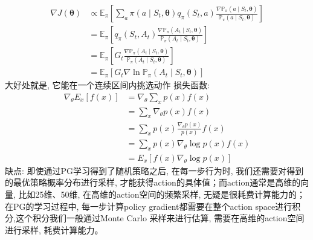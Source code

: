 \documentclass{article}
\begin{document}
        \begin{align*}
            \nabla J(\boldsymbol{\theta}) 
            & \propto \mathbb{E}_{\pi}\left[\sum_{a} \pi\left(a \mid S_{t}, \boldsymbol{\theta}\right) q_{\pi}\left(S_{t}, a\right) \frac{\nabla \mathbb{P}_\pi\left(a \mid S_{t}, \boldsymbol{\theta}\right)}{\mathbb{P}_\pi\left(a \mid S_{t}, \boldsymbol{\theta}\right)}\right] \\
            &= \mathbb{E}_{\pi}\left[q_{\pi}\left(S_{t}, A_{t}\right) \frac{\nabla \mathbb{P}_\pi\left(A_{t} \mid S_{t}, \boldsymbol{\theta}\right)}{\mathbb{P}_\pi\left(A_{t} \mid S_{t}, \boldsymbol{\theta}\right)}\right] \\
            &= \mathbb{E}_{\pi}\left[G_{t} \frac{\nabla \mathbb{P}_\pi\left(A_{t} \mid S_{t}, \boldsymbol{\theta}\right)}{\mathbb{P}_\pi\left(A_{t} \mid S_{t}, \boldsymbol{\theta}\right)}\right]\\
            &= \mathbb{E}_{\pi}\left[G_{t} \nabla \ln \mathbb{P}_\pi \left(A_{t} \mid S_{t}, \boldsymbol{\theta}\right)\right]
        \end{align*}
        大好处就是, 它能在一个连续区间内挑选动作
        损失函数:
            \begin{align*}
                \nabla_{\theta} E_{x}[f(x)] &=\nabla_{\theta} \sum_{x} p(x) f(x) \\
                &=\sum_{x} \nabla_{\theta} p(x) f(x) \\
                &=\sum_{x} p(x) \frac{\nabla_{\theta} p(x)}{p(x)} f(x) \\
                &=\sum_{x} p(x) \nabla_{\theta} \log p(x) f(x) \\
                &=E_{x}\left[f(x) \nabla_{\theta} \log p(x)\right]
            \end{align*}
        缺点:
            即使通过PG学习得到了随机策略之后, 在每一步行为时, 我们还需要对得到的最优策略概率分布进行采样, 才能获得action的具体值；而action通常是高维的向量, 比如25维、50维, 在高维的action空间的频繁采样, 无疑是很耗费计算能力的；\\
            在PG的学习过程中, 每一步计算policy gradient都需要在整个action space进行积分,这个积分我们一般通过Monte Carlo 采样来进行估算, 需要在高维的action空间进行采样, 耗费计算能力。
            
\end{document}
